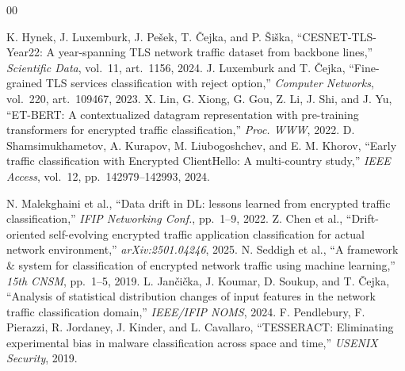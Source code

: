 %
\begin{thebibliography}{00}

 K. Hynek, J. Luxemburk, J. Pe\v{s}ek, T. \v{C}ejka, and P. \v{S}i\v{s}ka, ``CESNET-TLS-Year22: A year-spanning TLS network traffic dataset from backbone lines,'' \textit{Scientific Data}, vol.~11, art.~1156, 2024.
 J. Luxemburk and T. \v{C}ejka, ``Fine-grained TLS services classification with reject option,'' \textit{Computer Networks}, vol.~220, art.~109467, 2023.
 X. Lin, G. Xiong, G. Gou, Z. Li, J. Shi, and J. Yu, ``ET-BERT: A contextualized datagram representation with pre-training transformers for encrypted traffic classification,'' \textit{Proc. WWW}, 2022. %
 D. Shamsimukhametov, A. Kurapov, M. Liubogoshchev, and E. M. Khorov, ``Early traffic classification with Encrypted ClientHello: A multi-country study,'' \textit{IEEE Access}, vol.~12, pp.~142979--142993, 2024.

 N. Malekghaini et al., ``Data drift in DL: lessons learned from encrypted traffic classification,'' \textit{IFIP Networking Conf.}, pp.~1--9, 2022.
 Z. Chen et al., ``Drift-oriented self-evolving encrypted traffic application classification for actual network environment,'' \textit{arXiv:2501.04246}, 2025.
 N. Seddigh et al., ``A framework \& system for classification of encrypted network traffic using machine learning,'' \textit{15th CNSM}, pp.~1--5, 2019.
 L. Jan\v{c}i\v{c}ka, J. Koumar, D. Soukup, and T. \v{C}ejka, ``Analysis of statistical distribution changes of input features in the network traffic classification domain,'' \textit{IEEE/IFIP NOMS}, 2024.
 F. Pendlebury, F. Pierazzi, R. Jordaney, J. Kinder, and L. Cavallaro, ``TESSERACT: Eliminating experimental bias in malware classification across space and time,'' \textit{USENIX Security}, 2019. %


\end{thebibliography}
